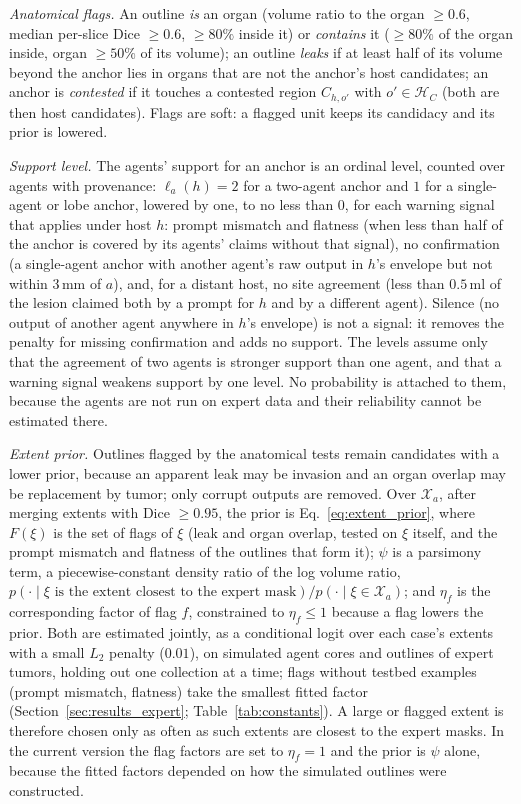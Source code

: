 \documentclass[fleqn,10pt]{olplainarticle}
\begin{document}
\emph{Anatomical flags.} An outline \emph{is} an organ (volume ratio to the organ $\ge0.6$, median per-slice Dice $\ge0.6$,
$\ge80\%$ inside it) or \emph{contains} it ($\ge80\%$ of the organ inside, organ $\ge50\%$ of its volume); an outline
\emph{leaks} if at least half of its volume beyond the anchor lies in organs that are not the anchor's host candidates;
an anchor is \emph{contested} if it touches a contested region $C_{h,o'}$ with $o'\in\mathcal{H}_C$ (both are then host
candidates). Flags are soft: a flagged unit keeps its candidacy and its prior is lowered.

\emph{Support level.} The agents' support for an anchor is an ordinal level, counted over agents with provenance:
$\ell_a(h)=2$ for a two-agent anchor and $1$ for a single-agent or lobe anchor, lowered by one, to no less than $0$, for
each warning signal that applies under host $h$: prompt mismatch and flatness (when less than half of the anchor is
covered by its agents' claims without that signal), no confirmation (a single-agent anchor with another agent's raw output
in $h$'s envelope but not within $3$\,mm of $a$), and, for a distant host, no site agreement (less than $0.5$\,ml of the
lesion claimed both by a prompt for $h$ and by a different agent). Silence (no output of another agent anywhere in $h$'s
envelope) is not a signal: it removes the penalty for missing confirmation and adds no support. The levels assume only
that the agreement of two agents is stronger support than one agent, and that a warning signal weakens support by one
level. No probability is attached to them, because the agents are not run on expert data and their reliability cannot be
estimated there.

\emph{Extent prior.} Outlines flagged by the anatomical tests remain candidates with a lower prior, because an apparent
leak may be invasion and an organ overlap may be replacement by tumor; only corrupt outputs are removed. Over
$\mathcal{X}_a$, after merging extents with Dice $\ge0.95$, the prior is Eq.~\eqref{eq:extent_prior}, where $F(\xi)$ is the set of flags of $\xi$ (leak and organ overlap, tested on $\xi$ itself, and the prompt mismatch and
flatness of the outlines that form it); $\psi$ is a parsimony term, a piecewise-constant density ratio of the log volume
ratio, $p(\cdot\mid\xi\text{ is the extent closest to the expert mask})/p(\cdot\mid\xi\in\mathcal{X}_a)$; and $\eta_f$ is
the corresponding factor of flag $f$, constrained to $\eta_f\le1$ because a flag lowers the prior. Both are estimated
jointly, as a conditional logit over each case's extents with a small $L_2$ penalty ($0.01$), on simulated agent cores
and outlines of expert tumors, holding out one collection at a time; flags without testbed examples (prompt mismatch,
flatness) take the smallest fitted factor (Section~\ref{sec:results_expert}; Table~\ref{tab:constants}). A large or
flagged extent is therefore chosen only as often as such extents are closest to the expert masks. In the current version
the flag factors are set to $\eta_f=1$ and the prior is $\psi$ alone, because the fitted factors depended on how the
simulated outlines were constructed.
\end{document}
